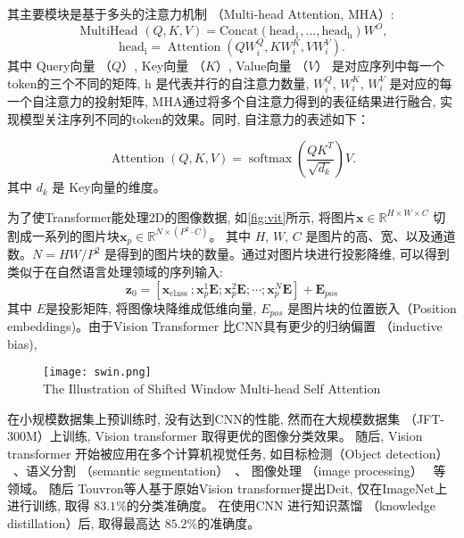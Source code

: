 其主要模块是基于多头的注意力机制 （Multi-head Attention, MHA）:
\begin{equation}
    \text { MultiHead }(Q, K, V)=\text {Concat}\left(\text {head}_1, \ldots, \text {head}_{\mathrm{h}}\right) W^O,
\end{equation}
\begin{equation}
    \text {head}_{\mathrm{i}}=\operatorname{Attention}\left(Q W_i^Q, K W_i^K, V W_i^V\right).
\end{equation}
其中 Query向量 （$Q$）, Key向量 （$K$）, Value向量 （$V$） 是对应序列中每一个token的三个不同的矩阵, h 是代表并行的自注意力数量, $W_i^Q$, $W_i^K$, $W_i^V$ 是对应的每一个自注意力的投射矩阵, MHA通过将多个自注意力得到的表征结果进行融合, 实现模型关注序列不同的token的效果。同时, 自注意力的表述如下：

\begin{equation}
    \operatorname{Attention}(Q, K, V)=\operatorname{softmax}\left(\frac{Q K^T}{\sqrt{d_k}}\right) V.
    \label{eq:attention}
\end{equation}
其中 $d_k$ 是 Key向量的维度。\par
为了使Transformer能处理2D的图像数据, 如\ref{fig:vit}所示, 将图片$\mathbf{x} \in \mathbb{R}^{H \times W \times C}$ 切割成一系列的图片块$\mathbf{x}_p \in \mathbb{R}^{N \times\left(P^2 \cdot C\right)}$。 其中 $H$, $W$, $C$ 是图片的高、宽、以及通道数。$N=H W / P^2$ 是得到的图片块的数量。通过对图片块进行投影降维, 可以得到类似于在自然语言处理领域的序列输入:
\begin{equation}
    \mathbf{z}_0=\left[\mathbf{x}_{\text {class }} ; \mathbf{x}_p^1 \mathbf{E} ; \mathbf{x}_p^2 \mathbf{E} ; \cdots ; \mathbf{x}_p^N \mathbf{E}\right]+\mathbf{E}_{p o s}
\end{equation}
其中 $E$是投影矩阵, 将图像块降维成低维向量, $E_{pos}$ 是图片块的位置嵌入（Position embeddings)。由于Vision Transformer 比CNN具有更少的归纳偏置 （inductive bias),
\begin{figure}[!htp]
    \centering
    \texttt{[image: swin.png]} \\
      {The Illustration of Shifted Window Multi-head Self Attention }
   \label{fig:swin}
\end{figure}

在小规模数据集上预训练时, 没有达到CNN的性能, 然而在大规模数据集 （JFT-300M）上训练, Vision transformer 取得更优的图像分类效果。 随后, Vision transformer 开始被应用在多个计算机视觉任务, 如目标检测（Object detection） ~\cite{carion2020end, zhu2021deformable}、语义分割 （semantic segmentation）~\cite{zheng2021rethinking, xie2021segformer, strudel2021segmenter, jin2021trseg, zhu2021unified}、 图像处理 （image processing）~\cite{chen2021pre} 等领域。 随后 Touvron等人基于原始Vision transformer提出Deit, 仅在ImageNet上进行训练, 取得 $83.1\%$的分类准确度。 在使用CNN 进行知识蒸馏 （knowledge distillation）后, 取得最高达 $85.2\%$的准确度。\par

